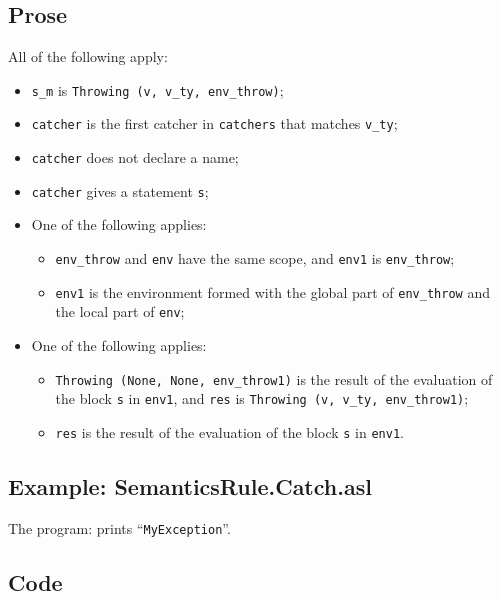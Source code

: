 \documentclass{book}
\begin{document}
    \subsection{Prose}
    All of the following apply:
    \begin{itemize}
    \item \texttt{s\_m} is \texttt{Throwing (v, v\_ty, env\_throw)};
    \item \texttt{catcher} is the first catcher in \texttt{catchers} that matches \texttt{v\_ty};
    \item \texttt{catcher} does not declare a name;
    \item \texttt{catcher} gives a statement \texttt{s};
    \item One of the following applies:
      \begin{itemize}
      \item \texttt{env\_throw} and \texttt{env} have the same scope, and \texttt{env1} is \texttt{env\_throw};
      \item \texttt{env1} is the environment formed with the global part of \texttt{env\_throw}
        and the local part of \texttt{env};
      \end{itemize}
    \item One of the following applies:
      \begin{itemize}
      \item \texttt{Throwing (None, None, env\_throw1)} is the result of the evaluation of
        the block \texttt{s} in \texttt{env1}, and \texttt{res} is \texttt{Throwing (v, v\_ty, env\_throw1)};
      \item \texttt{res} is the result of the evaluation of the block \texttt{s} in \texttt{env1}.
      \end{itemize}
    \end{itemize}

    \subsection{Example: SemanticsRule.Catch.asl}
    The program:
    prints ``\texttt{MyException}''.

  \subsection{Code}
\end{document}

